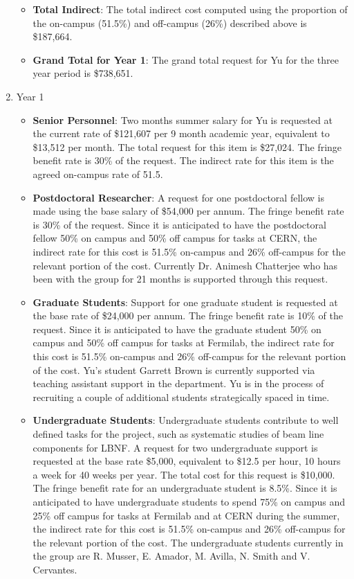 \begin{enumerate}
\begin{itemize}[noitemsep,nolistsep]
\item {{\bf Total Indirect}: The total indirect cost computed using the proportion of the on-campus (51.5\%) and off-campus (26\%) described above is \$187,664.}

\item {{\bf Grand Total for Year 1}: The grand total request for Yu for the three year period is \$738,651.}

\end{itemize}

\item{Year 1}
\begin{itemize}[noitemsep,nolistsep]
\item{{\bf Senior Personnel}: Two months summer salary for Yu is requested at the current rate of \$121,607 per 9 month academic year, equivalent to \$13,512 per month.  The total request for this item is \$27,024. The fringe benefit rate is 30\% of the request.  The indirect rate for this item is the agreed on-campus rate of 51.5.}

\item {{\bf Postdoctoral Researcher}: A request for one postdoctoral fellow is made using the base salary of \$54,000 per annum.  The fringe benefit rate is 30\% of the request.  Since it is anticipated to have the postdoctoral fellow 50\% on campus and 50\% off campus for tasks at CERN, the indirect rate for this cost is 51.5\% on-campus and 26\% off-campus for the relevant portion of the cost.  Currently Dr. Animesh Chatterjee who has been with the group for 21 months is supported through this request.} 

\item{{\bf Graduate Students}: Support for one graduate student is requested at the base rate of \$24,000 per annum.   The fringe benefit rate is 10\% of the request.  Since it is anticipated to have the graduate student 50\% on campus and 50\% off campus for tasks at Fermilab, the indirect rate for this cost is 51.5\% on-campus and 26\% off-campus for the relevant portion of the cost.   Yu’s student Garrett Brown is currently supported via teaching assistant support in the department.   Yu is in the process of recruiting a couple of additional students strategically spaced in time. }

\item {{\bf Undergraduate Students}: Undergraduate students contribute to well defined tasks for the project, such as systematic studies of beam line components for LBNF.  A request for two undergraduate support is requested at the base rate \$5,000, equivalent to \$12.5 per hour, 10 hours a week for 40 weeks per year.  The total cost for this request is \$10,000.  The fringe benefit rate for an undergraduate student is 8.5\%.  Since it is anticipated to have undergraduate students to spend 75\% on campus and 25\% off campus for tasks at Fermilab and at CERN during the summer, the indirect rate for this cost is 51.5\% on-campus and 26\% off-campus for the relevant portion of the cost.   The undergraduate students currently in the group are R. Musser,  E. Amador, M. Avilla, N. Smith and V. Cervantes.}


\end{itemize}
\end{enumerate}
